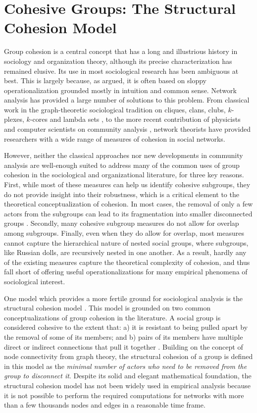 \chapter{Cohesive Groups: The Structural Cohesion Model}
\label{structural_cohesion}

Group cohesion is a central concept that has a long and illustrious history in sociology and organization theory, although its precise characterization has remained elusive. Its use in most sociological research has been ambiguous at best. This is largely because, as \citet{moody:2003} argued, it is often based on sloppy operationalization grounded mostly in intuition and common sense. Network analysis has provided a large number of solutions to this problem. From classical work in the graph-theoretic sociological tradition on cliques, clans, clubs, $k$-plexes, $k$-cores and lambda sets \citep[chapter 8]{wasserman:1994}, to the more recent contribution of physicists and computer scientists on community analysis \citep{fortunato:2010}, network theorists have provided researchers with a wide range of measures of cohesion in social networks.

However, neither the classical approaches nor new developments in community analysis are well-enough suited to address many of the common uses of group cohesion in the sociological and organizational literature, for three key reasons. First, while most of these measures can help us identify cohesive subgroups, they do not provide insight into their robustness, which is a critical element to the theoretical conceptualization of cohesion. In most cases, the removal of only a few actors from the subgroups can lead to its fragmentation into smaller disconnected groups \citep{white:2001}. Secondly, many cohesive subgroup measures do not allow for overlap among subgroups. Finally, even when they do allow for overlap, most measures cannot capture the hierarchical nature of nested social groups, where subgroups, like Russian dolls, are recursively nested in one another. As a result, hardly any of the existing measures capture the theoretical complexity of cohesion, and thus fall short of offering useful operationalizations for many empirical phenomena of sociological interest.

One model which provides a more fertile ground for sociological analysis is the structural cohesion model \citep{white:2001,moody:2003}. This model is grounded on two common conceptualizations of group cohesion in the literature. A social group is considered cohesive to the extent that: a) it is resistant to being pulled apart by the removal of some of its members; and b) pairs of its members have multiple direct or indirect connections that pull it together \citep[309-310]{white:2001}. Building on the concept of node connectivity from graph theory, the structural cohesion of a group is defined in this model as the \emph{minimal number of actors who need to be removed from the group to disconnect it}. Despite its solid and elegant mathematical foundation, the structural cohesion model has not been widely used in empirical analysis because it is not possible to perform the required computations for networks with more than a few thousands nodes and edges in a reasonable time frame.

